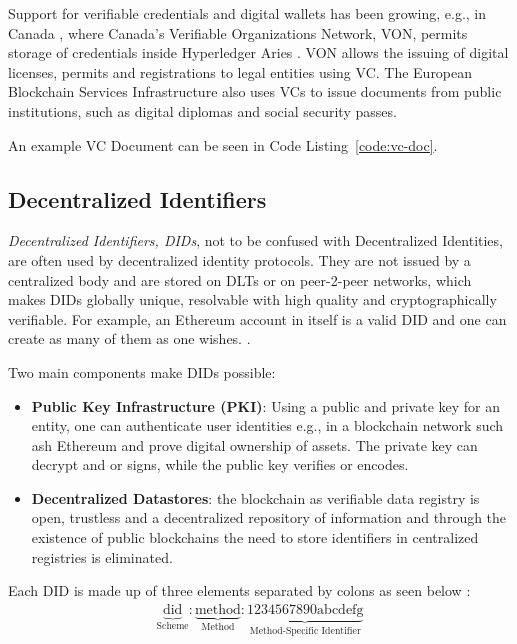 Support for verifiable credentials and digital wallets has been growing, e.g., in Canada \cite{preukschat2021self},
where Canada's Verifiable Organizations Network, VON, permits storage of credentials inside Hyperledger Aries
\cite{hyperledger:wiki}. VON allows the issuing of digital licenses, permits and registrations to legal entities using
VC.
The European Blockchain Services Infrastructure also uses VCs to issue documents from public institutions, such as
digital diplomas and social security passes. \cite{williams2020cross}

An example VC Document can be seen in Code Listing~\ref{code:vc-doc}.

\subsection{Decentralized Identifiers} %
\label{sec:Decentralized Identifiers}
\textit{Decentralized Identifiers, DIDs}, not to be confused with Decentralized Identities, are often used by
decentralized identity protocols. \cite{w3c2022did} They are not issued by a centralized body and are stored on DLTs
or on peer-2-peer networks, which makes DIDs globally unique, resolvable with high quality and cryptographically
verifiable. \cite{w3c-did-primer} For example, an Ethereum account in itself is a valid DID and one can create as many
of them as one wishes. \cite{eth-decentralized-identity}.

Two main components make DIDs possible: \cite{eth-decentralized-identity}
\begin{itemize}
	\item \textbf{Public Key Infrastructure (PKI)}: Using a public and private key for an entity, one can
	      authenticate user identities e.g., in a blockchain network such ash Ethereum and prove digital ownership
	      of assets.
	      The private key can decrypt and or signs, while the public key verifies or encodes.
	\item \textbf{Decentralized Datastores}: the blockchain as verifiable data registry is open, trustless and a
	      decentralized repository of information and through the existence of public blockchains the need to store
	      identifiers in centralized registries is eliminated.
\end{itemize}

Each DID is made up of three elements separated by colons as seen below \cite{w3c2022did}:
\begin{align*}
	\underbrace{\text{did}}_{\text{Scheme}} :
	\underbrace{\text{method}}_{\text{Method}} :
	\underbrace{\text{1234567890abcdefg}}_{\text{Method-Specific Identifier}}
\end{align*}

